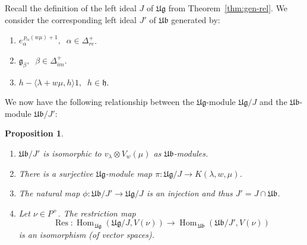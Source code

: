 \documentclass[12pt,reqno]{amsart}
\theoremstyle{plain}
\newtheorem{proposition}[theorem]{Proposition}
\theoremstyle{definition}
\theoremstyle{remark}
\theoremstyle{plain}
\newcommand{\posreal}[1][+]{\Delta_{re}^{#1}}
\newcommand{\posimag}{\Delta_{im}^+}
\newcommand{\lie}{\mathfrak}
\DeclareMathOperator{\Res}{Res}
\DeclareMathOperator{\Hom}{Hom}
\begin{document}
\subsection{}
Recall the definition of the left ideal $J$ of $\mathfrak{Ug}$ from Theorem~\ref{thm:gen-rel}. We consider the corresponding left ideal $J'$ of $\mathfrak{Ub}$ generated by:
\begin{enumerate}
    \item $e_\alpha^{\,p_\alpha (w\mu)+1}, \;\; \alpha \in \posreal$.
        \item ${\lie g}_\beta, \;\; \beta \in \posimag$.
        \item $ h - \langle \lambda + w\mu, h \rangle 1, \;\; h \in \mathfrak{h}$.
    \end{enumerate}
We now have the following relationship between the $\mathfrak{Ug}$-module $\mathfrak{Ug}/J$ and the $\mathfrak{Ub}$-module $\mathfrak{Ub}/J'$:
\begin{proposition}\label{prop:ugj-ubjprime}
    \begin{enumerate}
        \item $\mathfrak{Ub}/J'$ is isomorphic to $v_\lambda \otimes V_w(\mu)$ as $\mathfrak{Ub}$-modules.
        \item There is a surjective $\mathfrak{Ug}$-module map $\pi: \mathfrak{Ug}/J \to K(\lambda,w,\mu)$.
        \item The natural map $\phi: \mathfrak{Ub}/J' \to \mathfrak{Ug}/J$ is an injection and thus $J' = J \cap \mathfrak{Ub}$.
        \item Let $\nu \in P^+$. The restriction map
        \begin{equation}\label{eq:resmapcap}
\Res: \Hom_{\,\mathfrak{Ug}} (\mathfrak{Ug}/J, V(\nu)) \to \Hom_{\,\mathfrak{Ub}} (\mathfrak{Ub}/J', V(\nu))            
        \end{equation}
        is an isomorphism (of vector spaces).
    \end{enumerate}
\end{proposition}
\end{document}
